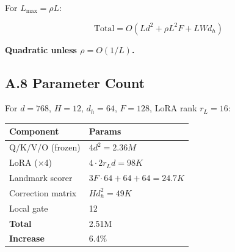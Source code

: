 For $L_\text{max} = \rho L$:

\[
\text{Total} = O(L d^2 + \rho L^2 F + L W d_h)
\]

\textbf{Quadratic unless $\rho = O(1/L)$.}

\subsection{A.8 Parameter Count}

For $d = 768$, $H = 12$, $d_h = 64$, $F = 128$, LoRA rank $r_L = 16$:

\begin{table}[H]
\centering
\small
\begin{tabular}{ll}
\toprule
\textbf{Component} & \textbf{Params} \\
\midrule
Q/K/V/O (frozen) & $4 d^2 = 2.36M$ \\
LoRA ($\times$4) & $4 \cdot 2 r_L d = 98K$ \\
Landmark scorer & $3F \cdot 64 + 64 + 64 = 24.7K$ \\
Correction matrix & $H d_h^2 = 49K$ \\
Local gate & 12 \\
\textbf{Total} & 2.51M \\
\textbf{Increase} & 6.4\% \\
\bottomrule
\end{tabular}
\end{table}

